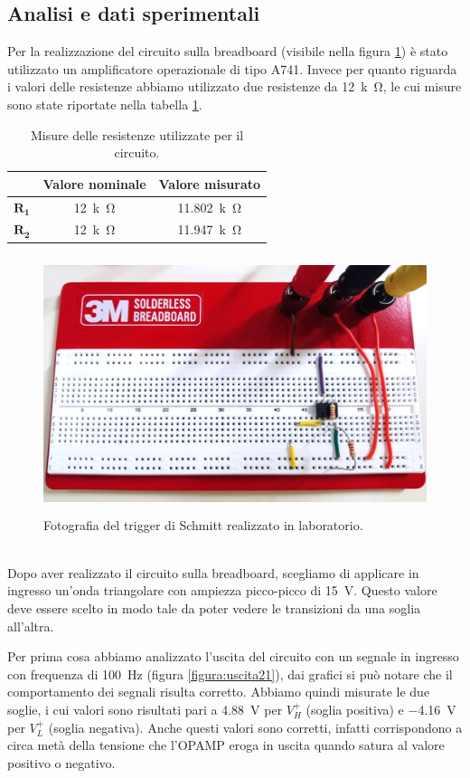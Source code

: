 \documentclass{report}
\begin{document}
\subsection{Analisi e dati sperimentali}
Per la realizzazione del circuito sulla breadboard (visibile nella figura \ref{figura:circuito2}) è stato utilizzato un amplificatore operazionale di tipo \textmu A741.
Invece per quanto riguarda i valori delle resistenze abbiamo utilizzato due resistenze da \SI{12}{k\ohm}, le cui misure sono state riportate nella tabella \ref{table:mis_res2}.
\begin{table}[h!]
	\centering
	\begin{tabular}{|c|c|c|}
		\cline{2-3} 
		\multicolumn{1}{c|}{} & \textbf{Valore nominale} & \textbf{Valore misurato}\\ 
		\hline
		$\mathbf{R_1}$ & \SI{12}{k\ohm} & \SI{11.802}{k\ohm} \\ 
		\hline
		$\mathbf{R_2}$ & \SI{12}{k\ohm} & \SI{11.947}{k\ohm} \\ 
		\hline
	\end{tabular}
	\caption{Misure delle resistenze utilizzate per il circuito.}
	\label{table:mis_res2}
\end{table}
\begin{figure}[h]
	\centering
	\includegraphics[height=7.5cm]{immagini/circuito2}
	\caption{Fotografia del trigger di Schmitt realizzato in laboratorio.}
	\label{figura:circuito2}
\end{figure}
\\Dopo aver realizzato il circuito sulla breadboard, scegliamo di applicare in ingresso un'onda triangolare con ampiezza picco-picco di \SI{15}{\volt}. Questo valore deve essere scelto in modo tale da poter vedere le transizioni da una soglia all'altra.\par
Per prima cosa abbiamo analizzato l'uscita del circuito con un segnale in ingresso con frequenza di \SI{100}{\hertz} (figura \ref{figura:uscita21}), dai grafici si può notare che il comportamento dei segnali risulta corretto. Abbiamo quindi misurate le due soglie, i cui valori sono risultati pari a \SI{4.88}{\volt} per ${V_H^+}$ (soglia positiva) e \SI{-4.16}{\volt} per ${V_L^+}$ (soglia negativa). Anche questi valori sono corretti, infatti corrispondono a circa metà della tensione che l'OPAMP eroga in uscita quando satura al valore positivo o negativo.
\end{document}
